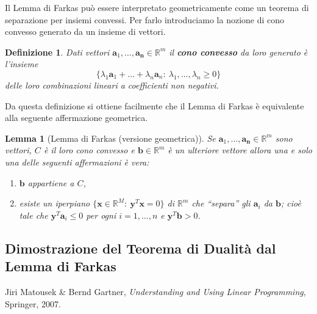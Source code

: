 \documentclass[italian, letter paper, 12pt, reqno]{article}
\theoremstyle{myteo}
\newtheorem{lemma}[theorem]{Lemma}
\newtheorem{definition}[theorem]{Definizione}
\numberwithin{equation}{section}
\begin{document}
Il Lemma di Farkas può essere interpretato geometricamente come un teorema di separazione per insiemi convessi.
Per farlo introduciamo la nozione di cono convesso generato da un insieme di vettori.

\begin{definition}
  \label{def:cono_convesso}
  Dati vettori \(\mathbf{a}_1,\ldots,\mathbf{a_n}\in\mathbb{R}^m\) il \textbf{cono convesso} da loro generato è l'insieme
  \[\big\{\lambda_1\mathbf{a}_1+\ldots+\lambda_n\mathbf{a}_n\colon\ \lambda_1,\ldots,\lambda_n \geq 0\big\}\]
  delle loro combinazioni lineari a coefficienti non negativi.
\end{definition}

Da questa definizione si ottiene facilmente che il Lemma di Farkas è equivalente alla seguente affermazione geometrica.

\begin{lemma}[Lemma di Farkas (versione geometrica)]
  \label{lemma:farkas_geometrico}
  Se \(\mathbf{a}_1,\ldots,\mathbf{a_n}\in\mathbb{R}^m\) sono vettori, \(C\) è il loro cono convesso e \(\mathbf{b}\in\mathbb{R}^m\) è un ulteriore vettore allora una e solo una delle seguenti affermazioni è vera:
  \begin{enumerate}
  \item \(\mathbf{b}\) appartiene a \(C\),
  \item esiste un iperpiano \(\{\mathbf{x}\in\mathbb{R}^M\colon\ \mathbf{y}^T\mathbf{x} = 0\}\) di \(\mathbb{R}^m\) che ``separa'' gli \(\mathbf{a}_i\) da \(\mathbf{b}\); cioè tale che \(\mathbf{y}^T\mathbf{a}_i \leq 0\) per ogni \(i=1,\ldots, n\) e \(\mathbf{y}^T\mathbf{b} > 0\).
  \end{enumerate}
\end{lemma}

\subsection{Dimostrazione del Teorema di Dualità dal Lemma di Farkas}
\label{subsec:dim_dualità}

\begin{thebibliography}{1}
  Jiri Matousek \& Bernd Gartner,
  \textit{Understanding and Using Linear Programming},
  Springer,
  2007.
\end{thebibliography}
\end{document}
